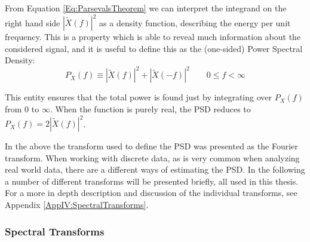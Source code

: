 \documentclass[../../CompleteThesis2/Complete_2ndDraft]{subfiles}
\begin{document}
From Equation \ref{Eq:ParsevalsTheorem} we can interpret the integrand on the right hand side $|\tilde{X}(f)|^2$ as a density function, describing the energy per unit frequency. This is a property which is able to reveal much information about the considered signal, and it is useful to define this as the (one-sided) Power Spectral Density: 
\begin{equation}
	P_X(f) \equiv |\tilde{X}(f)|^2 + |\tilde{X}(-f)|^2 \qquad 0 \leq f < \infty
\end{equation}

This entity ensures that the total power is found just by integrating over $P_X(f)$ from 0 to $\infty$. When the function is purely real, the PSD reduces to $P_X(f) = 2|\tilde{X}(f)|^2$.

In the above the transform used to define the PSD was presented as the Fourier transform. When working with discrete data, as is very common when analyzing real world data, there are a different ways of estimating the PSD. In the following a number of different transforms will be presented briefly, all used in this thesis. For a more in depth description and discussion of the individual transforms, see Appendix \ref{AppIV:SpectralTransforms}.


\subsubsection[Spectral Transforms][Spectral Transforms]{Spectral Transforms}
\label{Subsubsec:SignalAnalysis_BackDiffusion_SpectralAnalysis_SpectralTransforms}
\end{document}
